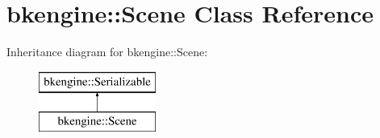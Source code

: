\hypertarget{classbkengine_1_1Scene}{}\section{bkengine\+:\+:Scene Class Reference}
\label{classbkengine_1_1Scene}
Inheritance diagram for bkengine\+:\+:Scene\+:\begin{figure}[H]
\begin{center}
\leavevmode
\includegraphics[height=2.000000cm]{classbkengine_1_1Scene}
\end{center}
\end{figure}
